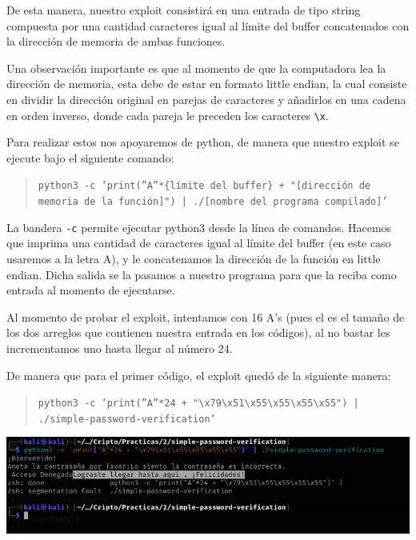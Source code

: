 De esta manera, nuestro exploit consistirá en una entrada de tipo string compuesta por una cantidad caracteres igual al límite del buffer concatenados con la dirección de memoria de ambas funciones. 

Una observación importante es que al momento de que la computadora lea la dirección de memoria, esta debe de estar en formato little endian, la cual consiste en dividir la dirección original en parejas de caracteres y añadirlos en una cadena en orden inverso, donde cada pareja le preceden los caracteres \texttt{\textbackslash x}.

Para realizar estos nos apoyaremos de python, de manera que nuestro exploit se ejecute bajo el siguiente comando:

\begin{quote}
\texttt{python3 -c 'print(''A''*\{límite del buffer\} + "[dirección de memoria de la función]") | ./[nombre del programa compilado]'}
\end{quote}


La bandera \texttt{-c} permite ejecutar python3 desde la línea de comandos. Hacemos que imprima una cantidad de caracteres igual al límite del buffer (en este caso usaremos a la letra A), y le concatenamos la dirección de la función en little endian. Dicha salida se la pasamos a nuestro programa para que la reciba como entrada al momento de ejecutarse.

Al momento de probar el exploit, intentamos con 16 A's (pues el es el tamaño de los dos arreglos que contienen nuestra entrada en los códigos), al no bastar les incrementamos uno hasta llegar al número 24.

De manera que para el primer código, el exploit quedó de la siguiente manera:

\begin{quote}
\texttt{python3 -c 'print(''A''*24 + "\textbackslash x79\textbackslash x51\textbackslash x55\textbackslash x55\textbackslash x55\textbackslash x55") | ./simple-password-verification'}
\end{quote}

\begin{center}
    \includegraphics[scale=.5]{img/exploitPassword.png}
\end{center}

